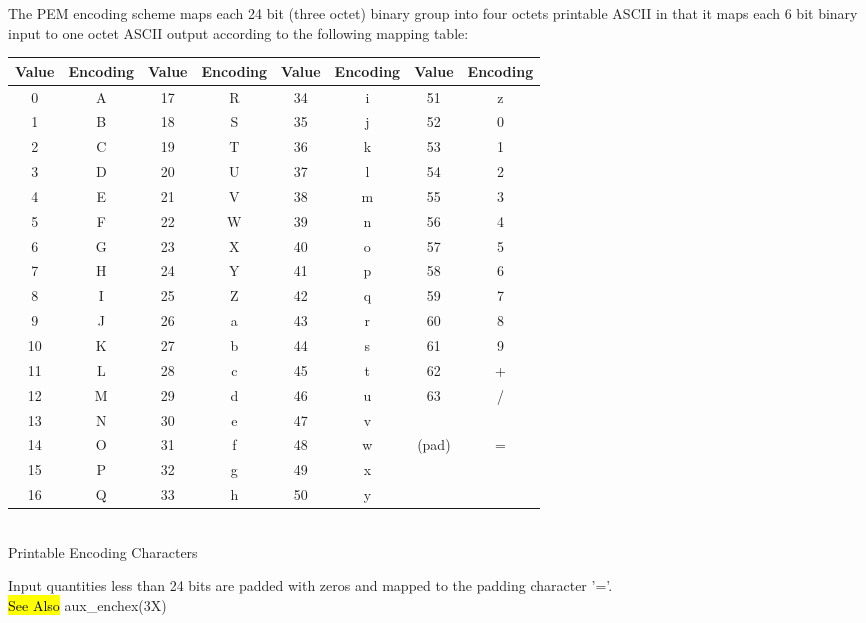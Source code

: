 \newpage
The PEM encoding scheme maps each 24 bit (three octet) binary group into four octets
printable ASCII in that it maps each 6 bit binary input to one octet ASCII output
according to the following mapping table:
\begin{center}
\begin{tabular} {|cc|cc|cc|cc|} \hline
Value & Encoding & Value & Encoding & Value & Encoding & Value & Encoding \\ \hline
 0 & A & 17 & R & 34 & i & 51 & z \\
 1 & B & 18 & S & 35 & j & 52 & 0 \\
 2 & C & 19 & T & 36 & k & 53 & 1 \\
 3 & D & 20 & U & 37 & l & 54 & 2 \\
 4 & E & 21 & V & 38 & m & 55 & 3 \\
 5 & F & 22 & W & 39 & n & 56 & 4 \\
 6 & G & 23 & X & 40 & o & 57 & 5 \\
 7 & H & 24 & Y & 41 & p & 58 & 6 \\
 8 & I & 25 & Z & 42 & q & 59 & 7 \\
 9 & J & 26 & a & 43 & r & 60 & 8 \\
10 & K & 27 & b & 44 & s & 61 & 9 \\
11 & L & 28 & c & 45 & t & 62 & + \\
12 & M & 29 & d & 46 & u & 63 & / \\
13 & N & 30 & e & 47 & v &    &   \\
14 & O & 31 & f & 48 & w & (pad) & = \\
15 & P & 32 & g & 49 & x &    &   \\
16 & Q & 33 & h & 50 & y &    &   \\ \hline
\end{tabular}
\\ [1em]
Printable Encoding Characters \\
\end{center}
Input quantities less than 24 bits are padded with zeros and mapped
to the padding character '='. \\ [1em]

\hl{See Also}
aux\_enchex(3X)

